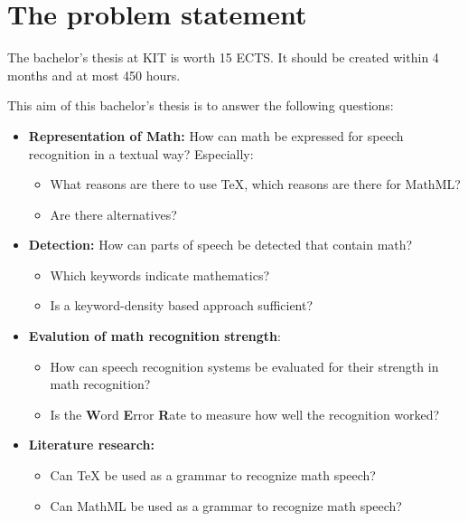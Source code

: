 \documentclass[a4paper]{scrartcl}
\begin{document}
\section{The problem statement}
    The bachelor's thesis at KIT is worth 15 ECTS. It should be
    created within 4 months and at most 450 hours.

    This aim of this bachelor's thesis is to answer the following
    questions:
    \begin{itemize}
        \item \textbf{Representation of Math:} How can math be expressed
              for speech recognition in a textual way?
              Especially:
            \begin{itemize}
                \item What reasons are there to use \TeX{}, which
              reasons are there for MathML?
                \item Are there alternatives?
            \end{itemize}
        \item \textbf{Detection:} How can parts of speech be detected
              that contain math?
            \begin{itemize}
                \item Which keywords indicate mathematics?
                \item Is a keyword-density based approach sufficient?
            \end{itemize}
        \item \textbf{Evalution of math recognition strength}:
            \begin{itemize}
                \item How can speech recognition systems be evaluated
                      for their strength in math recognition?
                \item Is the \textbf{W}ord \textbf{E}rror \textbf{R}ate
                      to measure how well the recognition worked?
            \end{itemize}
        \item \textbf{Literature research:}
            \begin{itemize}
                \item Can \TeX{} be used as a grammar to recognize math speech?
                \item Can MathML be used as a grammar to recognize math speech?
            \end{itemize}
    \end{itemize}
\end{document}
